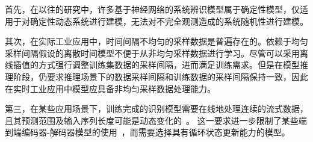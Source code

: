 首先，在以往的研究中，许多基于神经网络的系统辨识模型属于确定性模型，仅适用于对确定性动态系统进行建模，无法对不完全观测造成的系统随机性进行建模。

其次，在实际工业应用中，时间间隔不均匀的采样数据是普遍存在的\cite{kidger2021}。依赖于均匀采样间隔假设的离散时间模型不便于从非均匀采样数据进行学习。尽管可以采用离线插值的方式强行调整训练集数据的采样间隔，进而满足训练需求。但是在模型推理阶段，仍要求推理场景下的数据采样间隔和训练数据的采样间隔保持一致，因此在实时工业应用中模型应具备非均匀采样数据处理能力。

第三，在某些应用场景下，训练完成的识别模型需要在线地处理连续的流式数据，且其预测范围及输入序列长度可能是动态变化的~\cite{VSDN_Liu2020}。
这一要求进一步限制了某些端到端编码器-解码器模型的使用~\cite{Rubanova2019,Yildiz2019}，而需要选择具有循环状态更新能力的模型。


